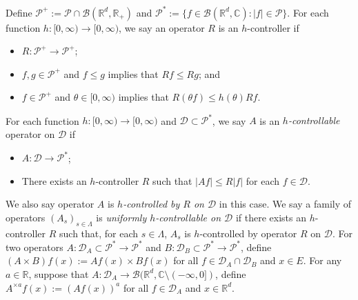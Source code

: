 \documentclass[12pt,a4paper]{amsart}
\theoremstyle{plain}
\theoremstyle{definition}
\numberwithin{equation}{section}
\begin{document}
    Define $\mathcal P^+:= \mathcal P \cap \mathcal B(\mathbb R^d, \mathbb R_+)$ and $\mathcal P^*:= \{f\in \mathcal B(\mathbb R^d, \mathbb C): |f|\in \mathcal P\}$.
    For each function $h: [0,\infty) \to [0,\infty)$, we say an operator $R$ is an $h$-controller if
\begin{itemize}
\item
    $R: \mathcal P^+ \to \mathcal P^+$;
\item
    $f, g\in \mathcal P^+$ and $f\leq g$ implies that $Rf \leq Rg$; and
\item
    $f \in \mathcal P^+$ and $\theta \in [0,\infty)$ implies that $ R (\theta f)\leq h(\theta) Rf$.
\end{itemize} 
    For each function $h: [0,\infty) \to [0,\infty)$ and $\mathcal D \subset \mathcal P^*$, we say $A$ is an \emph{$h$-controllable} operator on $\mathcal D$ if 
\begin{itemize}
\item
    $A : \mathcal D \to \mathcal P^*$;
\item
    There exists an $h$-controller $R$ such that $|Af| \leq R|f|$ for each $f\in \mathcal D$.
\end{itemize}
    We also say operator $A$ is \emph{$h$-controlled by $R$ on $\mathcal D$} in this case.
    We say a family of operators $(A_s)_{s\in \Lambda}$ is \emph{uniformly $h$-controllable on $\mathcal D$} if there exists an $h$-controller $R$ such that, for each $s\in \Lambda$, $A_s$ is $h$-controlled by operator $R$ on $\mathcal D$.   
    For two operators $A: \mathcal D_A \subset \mathcal P^*\to \mathcal P^*$ and $B: \mathcal D_B \subset \mathcal P^*\to \mathcal P^*$, define $(A \times B)f (x):= Af(x) \times Bf(x)$ for all $f\in \mathcal D_A \cap \mathcal D_B$ and $x\in E$.
    For any $a \in \mathbb R$, suppose that $A :\mathcal D_A \to \mathcal B(\mathbb R^d, \mathbb C\setminus (-\infty, 0])$, define $A^{\times a}f(x):= (Af(x))^a$ for all $f\in \mathcal D_A$ and $x\in \mathbb R^d$.
    
\end{document}
